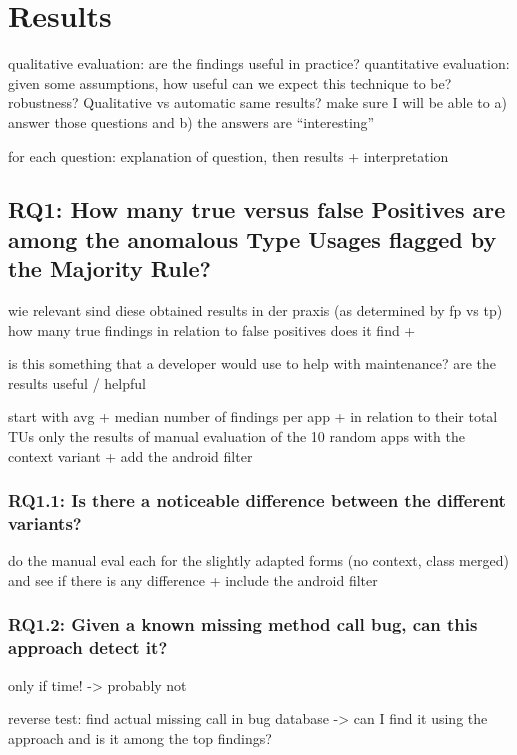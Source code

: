\section{Results}

qualitative evaluation: are the findings useful in practice?
quantitative evaluation: given some assumptions, how useful can we expect this technique to be? robustness? Qualitative vs automatic same results?
make sure I will be able to a) answer those questions and b) the answers are ``interesting''

for each question: explanation of question, then results + interpretation

\subsection{RQ1: How many true versus false Positives are among the anomalous Type Usages flagged by the Majority Rule?}

wie relevant sind diese obtained results in der praxis (as determined by fp vs tp)
how many true findings in relation to false positives does it find + 

is this something that a developer would use to help with maintenance?
are the results useful / helpful

start with avg + median number of findings per app + in relation to their total TUs
only the results of manual evaluation of the 10 random apps with the context variant
+ add the android filter

\subsubsection{RQ1.1: Is there a noticeable difference between the different variants?}

do the manual eval each for the slightly adapted forms (no context, class merged) and see if there is any difference
+ include the android filter

\subsubsection{RQ1.2: Given a known missing method call bug, can this approach detect it?}
only if time! -> probably not

reverse test: find actual missing call in bug database -> can I find it using the approach and is it among the top findings?

